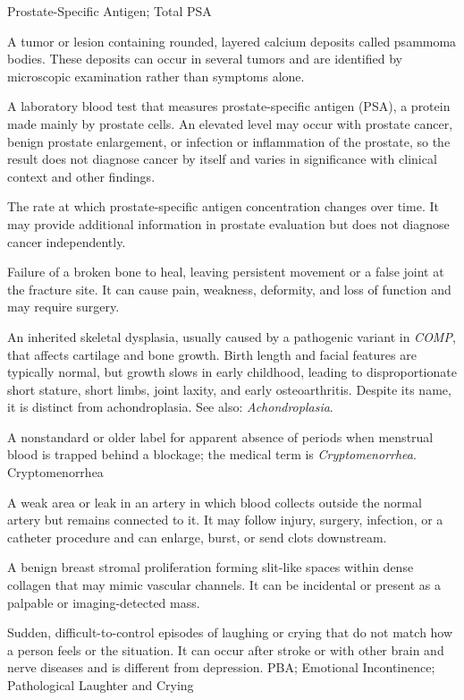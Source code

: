 \synonyms
Prostate-Specific Antigen; Total PSA

 A tumor or lesion containing rounded, layered calcium deposits called psammoma bodies. These deposits can occur in several tumors and are identified by microscopic examination rather than symptoms alone.

 A laboratory blood test that measures prostate-specific antigen (PSA), a protein made mainly by prostate cells. An elevated level may occur with prostate cancer, benign prostate enlargement, or infection or inflammation of the prostate, so the result does not diagnose cancer by itself and varies in significance with clinical context and other findings.

 The rate at which prostate-specific antigen concentration changes over time. It may provide additional information in prostate evaluation but does not diagnose cancer independently.

 Failure of a broken bone to heal, leaving persistent movement or a false joint at the fracture site. It can cause pain, weakness, deformity, and loss of function and may require surgery.

 An inherited skeletal dysplasia, usually caused by a pathogenic variant in \textit{COMP}, that affects cartilage and bone growth. Birth length and facial features are typically normal, but growth slows in early childhood, leading to disproportionate short stature, short limbs, joint laxity, and early osteoarthritis. Despite its name, it is distinct from achondroplasia. See also: \textit{Achondroplasia}.

 A nonstandard or older label for apparent absence of periods when menstrual blood is trapped behind a blockage; the medical term is \textit{Cryptomenorrhea}.
\synonyms
Cryptomenorrhea

 A weak area or leak in an artery in which blood collects outside the normal artery but remains connected to it. It may follow injury, surgery, infection, or a catheter procedure and can enlarge, burst, or send clots downstream.

 A benign breast stromal proliferation forming slit-like spaces within dense collagen that may mimic vascular channels. It can be incidental or present as a palpable or imaging-detected mass.

 Sudden, difficult-to-control episodes of laughing or crying that do not match how a person feels or the situation. It can occur after stroke or with other brain and nerve diseases and is different from depression.
\synonyms
PBA; Emotional Incontinence; Pathological Laughter and Crying

